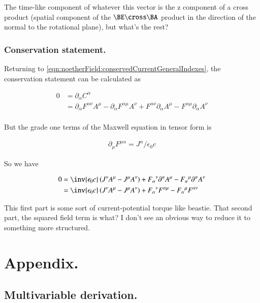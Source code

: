 The time-like component of whatever this vector is the z component of a cross product (spatial component of the $\BE \cross \BA$ product in
the direction of the normal to the rotational plane), but what's the rest?

\subsubsection{Conservation statement. }

Returning to \ref{eqn:noetherField:conservedCurrentGeneralIndexes}, the conservation statement can be calculated as

\begin{align*}
0 &= \partial_\alpha C^\alpha \\
&= \partial_\alpha F^{\alpha\nu} A^\mu - \partial_\alpha F^{\alpha\mu} A^\nu + F^{\alpha\nu} \partial_\alpha A^\mu - F^{\alpha\mu} \partial_\alpha A^\nu  \\
\end{align*}

But the grade one terms of the Maxwell equation in tensor form is

\begin{align*}
\partial_\mu F^{\mu \alpha} = J^\alpha/\epsilon_0 c
\end{align*}

So we have 

\begin{align*}
0 
&= \inv{\epsilon_0 c} \left(J^\nu A^\mu - J^\mu A^\nu \right) + {F_{\alpha}}^{\nu} \partial^\alpha A^\mu - {F_{\alpha}}^{\mu} \partial^\alpha A^\nu  \\
&= \inv{\epsilon_0 c} \left(J^\nu A^\mu - J^\mu A^\nu \right) + {F_{\alpha}}^{\nu} F^{\alpha \mu} - {F_{\alpha}}^{\mu} F^{\alpha\nu} \\
\end{align*}

This first part is some sort of current-potential torque like beastie.
That second part, the squared field term is what?  I don't see an obvious way to reduce it to something more structured.

\section{Appendix. }

\subsection{Multivariable derivation. }

